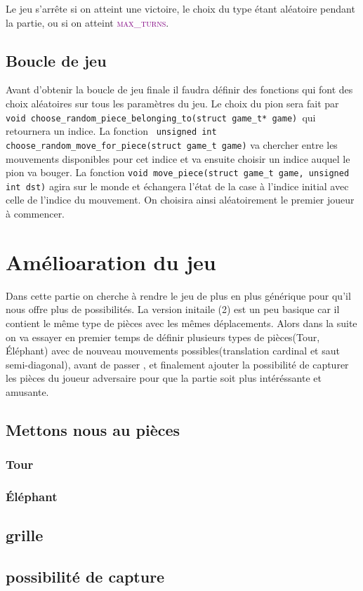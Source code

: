 \documentclass[a4paper]{article}
\begin{document}
Le jeu s’arrête si on atteint une victoire, le choix du type étant aléatoire pendant la partie, ou si on atteint \textcolor{purple}{\textsc{max\_turns}}. 
\subsection{Boucle de jeu}
Avant d’obtenir la boucle de jeu finale il faudra définir des fonctions qui font des choix aléatoires sur tous les paramètres du jeu. 
Le choix du pion sera fait par \lstinline|void choose_random_piece_belonging_to(struct game_t* game) |qui retournera un indice. La fonction \lstinline| unsigned int choose_random_move_for_piece(struct game_t game)| va chercher entre les mouvements disponibles pour cet indice et va ensuite choisir un indice auquel le pion va bouger. La fonction \lstinline|void move_piece(struct game_t game, unsigned int dst)| agira sur le monde et échangera l’état de la case à l’indice initial avec celle de l’indice du mouvement. On choisira ainsi aléatoirement le premier joueur à commencer. 



\section{Amélioaration du jeu}

Dans cette partie on cherche à rendre le jeu de plus en plus générique pour qu'il nous offre plus de possibilités. La version initaile (2) est un peu basique car il contient le même type de pièces avec les mêmes déplacements.
Alors dans la suite on va essayer en premier temps de définir plusieurs types de pièces(Tour, Éléphant) avec de nouveau mouvements possibles(translation cardinal et saut semi-diagonal), avant de passer , et finalement ajouter la possibilité de capturer les pièces du joueur adversaire pour que la partie soit plus intéréssante et amusante.
\subsection{Mettons nous au pièces}
\subsubsection{Tour}


\subsubsection{Éléphant}


\subsection{grille}


\subsection{possibilité de capture}
\subsubsection{}
\end{document}
